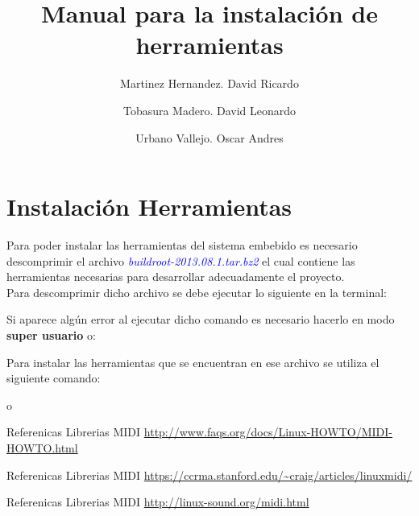 \documentclass[12pt,graphicx,caption,rotating]{article}
\begin{document}
\title{Manual para la instalación de herramientas}

\author[1]{Martinez Hernandez. David Ricardo}
\author[2]{Tobasura Madero. David Leonardo}
\author[3]{Urbano Vallejo. Oscar Andres}

\date{}
\maketitle

\section{Instalación Herramientas}
\noindent
Para poder instalar las herramientas del sistema embebido es necesario descomprimir el archivo \textit{\textcolor{blue}{buildroot-2013.08.1.tar.bz2}} el cual contiene las herramientas necesarias para desarrollar adecuadamente el proyecto.\\
Para descomprimir dicho archivo se debe ejecutar lo siguiente en la terminal:
\begin{center}
\end{center}
\noindent
Si aparece algún error al ejecutar dicho comando es necesario hacerlo en modo \textbf{super usuario} o:
\begin{center}
\end{center}
\noindent
Para instalar las herramientas que se encuentran en ese archivo se utiliza el siguiente comando:
\begin{center}
  o 
\end{center}


\begin{thebibliography}{99}

 Referenicas Librerias MIDI \url{http://www.faqs.org/docs/Linux-HOWTO/MIDI-HOWTO.html}

 Referenicas Librerias MIDI \url{https://ccrma.stanford.edu/~craig/articles/linuxmidi/}

 Referenicas Librerias MIDI \url{http://linux-sound.org/midi.html}

\end{thebibliography}
\end{document}
